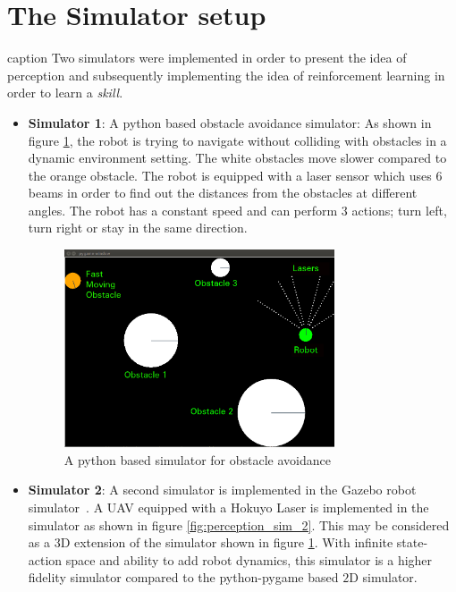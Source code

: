 \documentclass[12pt]{report}
\begin{document}
\section{The Simulator setup}caption
\label{sims}
Two simulators were implemented in order to present the idea of perception and subsequently implementing the idea of reinforcement learning in order to learn a \textit{skill}.
\begin{itemize}
\item \textbf{Simulator 1}: A python based obstacle avoidance simulator: As shown in figure \ref{fig:perception_sim_1}, the robot is trying to navigate without colliding with obstacles in a dynamic environment setting. The white obstacles move slower compared to the orange obstacle. The robot is equipped with a laser sensor which uses $6$ beams in order to find out the distances from the obstacles at different angles. The robot has a constant speed and can perform $3$ actions; turn left, turn right or stay in the same direction. 

\begin{figure}[htp]
	\centering
	\includegraphics[width=8cm]{perception_sim_1.png}
	\caption {A python based simulator for obstacle avoidance}
   \label{fig:perception_sim_1}
\end{figure}

\item \textbf{Simulator 2}: A second simulator is implemented in the Gazebo robot simulator~\cite{koenig2004design}. A UAV equipped with a Hokuyo Laser is implemented in the simulator as shown in figure \ref{fig:perception_sim_2}. This may be considered as a $3$D extension of the simulator shown in figure \ref{fig:perception_sim_1}. With infinite state-action space and ability to add robot dynamics, this simulator is a higher fidelity simulator compared to the python-pygame based $2$D simulator. 


\end{itemize}
\end{document}

